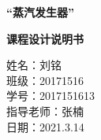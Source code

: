 


\begin{titlepage}
	\vspace*{4cm}
	\begin{center}
		\textbf{
			\Huge “蒸汽发生器”  
		}
		\vspace*{.5cm}
		\par
		\textbf{
			\Huge 课程设计说明书
		}

		\vspace*{8cm}
		姓名：刘铭  \\
		班级：20171516  \\
		学号：2017151613  \\
		指导老师：张楠 \\

		\vspace*{5cm}
		日期：2021.3.14
	\end{center}
	
\end{titlepage}